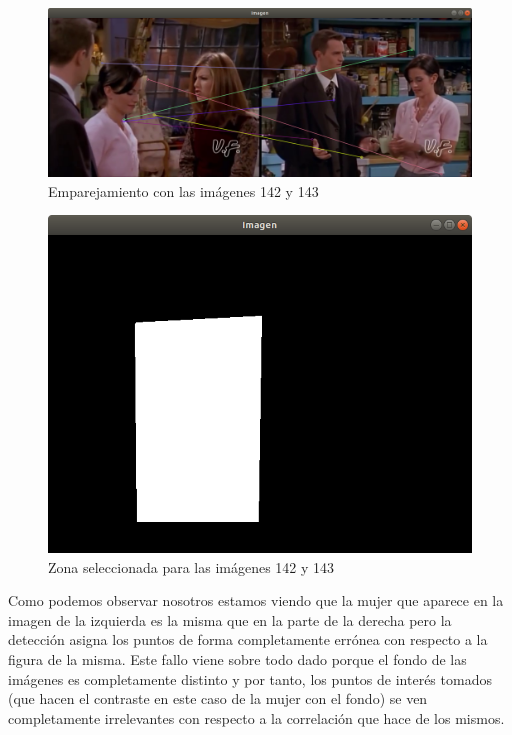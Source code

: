\documentclass[12pt,a4paper]{article}
\begin{document}
\begin{figure}[H]
  \centering
  \includegraphics[scale=0.35]{./Imagenes/Ejercicio1-4.png}
  \caption{Emparejamiento con las imágenes 142 y 143}
\end{figure}

\begin{figure}[H]
	\centering
	\includegraphics[scale=0.3]{./Imagenes/Ejercicio1-mascara4.png}
	\caption{Zona seleccionada para las imágenes 142 y 143}
\end{figure}

Como podemos observar nosotros estamos viendo que la mujer que aparece en la imagen de la izquierda es la misma que en la parte de la derecha pero la detección asigna los puntos de forma completamente errónea con respecto a la figura de la misma. Este fallo viene sobre todo dado porque el fondo de las imágenes es completamente distinto y por tanto, los puntos de interés tomados (que hacen el contraste en este caso de la mujer con el fondo) se ven completamente irrelevantes con respecto a la correlación que hace de los mismos.
\end{document}
